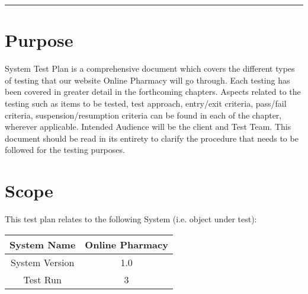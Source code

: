 \documentclass{article}
\date{}
\def\myversion{1.0 }
\begin{document}
\begin{center}
    \rule{16cm}{5pt}\vskip1cm
\end{center}

\tableofcontents
\newpage


\section{Purpose}
System Test Plan is a comprehensive document which covers the different types of testing that our website Online Pharmacy will go through. Each testing has been covered in greater detail in the forthcoming chapters. Aspects related to the testing such as items to be tested, test approach, entry/exit criteria, pass/fail criteria, suspension/resumption criteria can be found in each of the chapter, wherever applicable. Intended Audience will be the client and Test Team. This document should be read in its entirety to clarify the procedure that needs to be followed for the testing purposes.

\section{Scope}
This test plan relates to the following System (i.e. object under test):
\begin{flushleft}
    \begin{tabular}{|c|c|}
        \hline
	    System Name & Online Pharmacy\\
        \hline
	    System Version & 1.0\\
        \hline
	    Test Run & 3\\
        \hline
    \end{tabular}
\end{flushleft}
\end{document}
